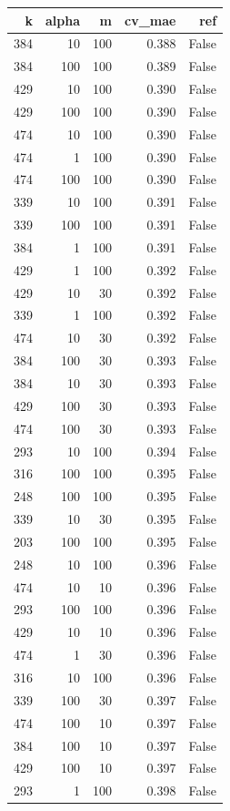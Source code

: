\begin{tabular}{rrrrr}
\toprule
k & alpha & m & cv_mae & ref \\
\midrule
384 & 10 & 100 & 0.388 & False \\
384 & 100 & 100 & 0.389 & False \\
429 & 10 & 100 & 0.390 & False \\
429 & 100 & 100 & 0.390 & False \\
474 & 10 & 100 & 0.390 & False \\
474 & 1 & 100 & 0.390 & False \\
474 & 100 & 100 & 0.390 & False \\
339 & 10 & 100 & 0.391 & False \\
339 & 100 & 100 & 0.391 & False \\
384 & 1 & 100 & 0.391 & False \\
429 & 1 & 100 & 0.392 & False \\
429 & 10 & 30 & 0.392 & False \\
339 & 1 & 100 & 0.392 & False \\
474 & 10 & 30 & 0.392 & False \\
384 & 100 & 30 & 0.393 & False \\
384 & 10 & 30 & 0.393 & False \\
429 & 100 & 30 & 0.393 & False \\
474 & 100 & 30 & 0.393 & False \\
293 & 10 & 100 & 0.394 & False \\
316 & 100 & 100 & 0.395 & False \\
248 & 100 & 100 & 0.395 & False \\
339 & 10 & 30 & 0.395 & False \\
203 & 100 & 100 & 0.395 & False \\
248 & 10 & 100 & 0.396 & False \\
474 & 10 & 10 & 0.396 & False \\
293 & 100 & 100 & 0.396 & False \\
429 & 10 & 10 & 0.396 & False \\
474 & 1 & 30 & 0.396 & False \\
316 & 10 & 100 & 0.396 & False \\
339 & 100 & 30 & 0.397 & False \\
474 & 100 & 10 & 0.397 & False \\
384 & 100 & 10 & 0.397 & False \\
429 & 100 & 10 & 0.397 & False \\
293 & 1 & 100 & 0.398 & False \\

\end{tabular}
